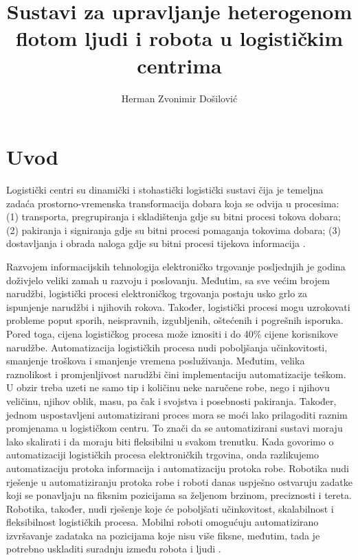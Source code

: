 \documentclass[times, utf8, seminar]{fer}
\begin{document}


\title{
    Sustavi za upravljanje heterogenom flotom ljudi i robota u logističkim centrima
}

\author{Herman Zvonimir Došilović}

\maketitle

\tableofcontents

\chapter{Uvod}
Logistički centri su dinamički i stohastički logistički sustavi
čija je temeljna zadaća prostorno-vremenska transformacija
dobara koja se odvija u procesima: (1) transporta, pregrupiranja i skladištenja gdje
su bitni procesi tokova dobara; (2) pakiranja i signiranja gdje su bitni procesi
pomaganja tokovima dobara; (3) dostavljanja i obrada naloga gdje su bitni procesi
tijekova informacija \citep{Paladin, buntak2012medjusobni}.

Razvojem informacijskih tehnologija elektroničko trgovanje 
 posljednjih je godina
doživjelo veliki zamah u razvoju i poslovanju. Međutim, sa sve većim brojem narudžbi,
logistički procesi elektroničkog trgovanja postaju usko grlo
za ispunjenje narudžbi i njihovih rokova. Također, logistički procesi mogu uzrokovati
probleme poput sporih, neispravnih, izgubljenih, oštećenih i pogrešnih isporuka.
Pored toga, cijena logističkog procesa može iznositi
i do 40\% cijene korisnikove narudžbe.
Automatizacija logističkih procesa nudi poboljšanja učinkovitosti, smanjenje troškova
i smanjenje vremena posluživanja. Međutim, velika raznolikost i promjenljivost
narudžbi čini implementaciju automatizacije teškom. U obzir treba uzeti
ne samo tip i količinu neke naručene robe, nego i njihovu veličinu, njihov
oblik, masu, pa čak i svojstva i posebnosti pakiranja. Također, jednom
uspostavljeni automatizirani proces mora se moći lako prilagoditi
raznim promjenama u logističkom centru. To znači da se automatizirani sustavi
moraju lako skalirati i da moraju biti fleksibilni u svakom trenutku.
Kada govorimo o automatizaciji logističkih procesa elektroničkih trgovina, onda
razlikujemo automatizaciju protoka informacija i automatizaciju protoka robe.
Robotika nudi rješenje u automatiziranju protoka robe i roboti danas uspješno
ostvaruju zadatke koji se ponavljaju na fiksnim pozicijama sa željenom brzinom,
preciznosti i tereta. Robotika, također, nudi rješenje koje će
poboljšati učinkovitost, skalabilnost i fleksibilnost logističkih procesa.
Mobilni roboti omogućuju automatizirano izvršavanje zadataka na pozicijama
koje nisu više fiksne, međutim, tada je potrebno uskladiti suradnju između robota
i ljudi \citep{huang2015robotics}.
\end{document}
